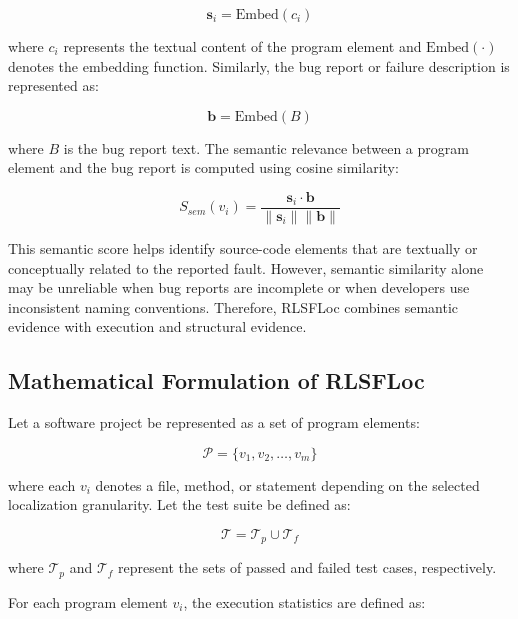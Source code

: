 \documentclass[article,article,submit,pdftex,moreauthors]{Definitions/mdpi}
\begin{document}
\begin{equation}
\mathbf{s}_i = \text{Embed}(c_i)
\end{equation}

where $c_i$ represents the textual content of the program element and $\text{Embed}(\cdot)$ denotes the embedding function. Similarly, the bug report or failure description is represented as:

\begin{equation}
\mathbf{b} = \text{Embed}(B)
\end{equation}

where $B$ is the bug report text. The semantic relevance between a program element and the bug report is computed using cosine similarity:

\begin{equation}
S_{sem}(v_i) = \frac{\mathbf{s}_i \cdot \mathbf{b}}{\|\mathbf{s}_i\| \|\mathbf{b}\|}
\end{equation}

This semantic score helps identify source-code elements that are textually or conceptually related to the reported fault. However, semantic similarity alone may be unreliable when bug reports are incomplete or when developers use inconsistent naming conventions. Therefore, RLSFLoc combines semantic evidence with execution and structural evidence.

\subsection{Mathematical Formulation of RLSFLoc}

Let a software project be represented as a set of program elements:

\begin{equation}
\mathcal{P} = \{v_1, v_2, \ldots, v_m\}
\end{equation}

where each $v_i$ denotes a file, method, or statement depending on the selected localization granularity. Let the test suite be defined as:

\begin{equation}
\mathcal{T} = \mathcal{T}_{p} \cup \mathcal{T}_{f}
\end{equation}

where $\mathcal{T}_{p}$ and $\mathcal{T}_{f}$ represent the sets of passed and failed test cases, respectively.

For each program element $v_i$, the execution statistics are defined as:
\end{document}
